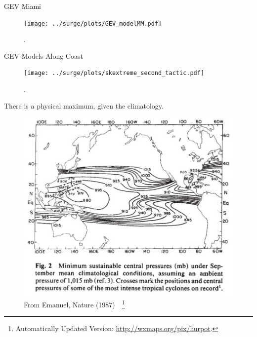 \begin{frame}{GEV Miami}
\vspace{-20pt}
 \begin{minipage}{1.0\textwidth}
\begin{figure}[htb!]
    \centering
    \texttt{[image: ../surge/plots/GEV\_modelMM.pdf]}
    \vspace{-15pt}
   \caption{. }
    \label{fig:}
\end{figure}
\end{minipage}
\end{frame}

\begin{frame}{GEV Models Along Coast}
\vspace{-20pt}
 \begin{minipage}{1.0\textwidth}
\begin{figure}[htb!]
    \centering
    \texttt{[image: ../surge/plots/skextreme\_second\_tactic.pdf]}
    \vspace{-15pt}
   \caption{. }
    \label{fig:}
\end{figure}
\end{minipage}
\end{frame}


\begin{frame}{There is a physical maximum, given the climatology.}

\vspace{-30pt}
\begin{figure}[htb!]
    \centering
    \includegraphics[width=0.8\linewidth]{images/hurricane-Emanuel-upper-bound.png}
    \vspace{-15pt}
   \caption{From Emanuel, Nature (1987)~\cite{emanuel1987dependence}~\footnote{Automatically Updated Version: \url{http://wxmaps.org/pix/hurpot}.} }
    \label{fig:}
\end{figure}
\end{frame}

